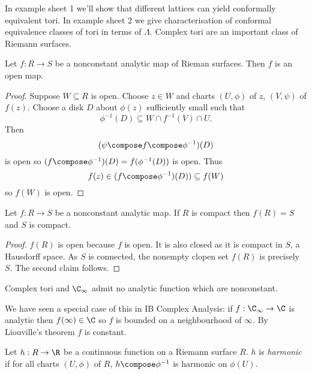 \documentclass[a4paper]{article}
\begin{document}
In example sheet 1 we'll show that different lattices can yield conformally equivalent tori. In example sheet 2 we give characterisation of conformal equivalence classes of tori in terms of \(\Lambda\). Complex tori are an important class of Riemann surfaces.

\begin{theorem}
  Let \(f: R \to S\) be a nonconstant analytic map of Rieman surfaces. Then \(f\) is an open map.
\end{theorem}

\begin{proof}
  Suppose \(W \subseteq R\) is open. Choose \(z \in W\) and charts \((U, \phi)\) of \(z\), \((V, \psi)\) of \(f(z)\). Choose a disk \(D\) about \(\phi(z)\) sufficiently small such that
  \[
    \phi^{-1}(D) \subseteq W \cap f^{-1}(V) \cap U.
  \]
  Then
  \[
    (\psi \compose f \compose \phi^{-1})(D)
  \]
  is open so \((f \compose \phi^{-1})(D) = f(\phi^{-1}(D))\) is open. Thus
  \[
    f(z) \in (f \compose \phi^{-1})(D)) \subseteq f(W)
  \]
  so \(f(W)\) is open.
\end{proof}

\begin{corollary}
  Let \(f: R \to S\) be a nonconstant analytic map. If \(R\) is compact then \(f(R) = S\) and \(S\) is compact.
\end{corollary}

\begin{proof}
  \(f(R)\) is open because \(f\) is open. It is also closed as it is compact in \(S\), a Hausdorff space. As \(S\) is connected, the nonempty clopen set \(f(R)\) is precisely \(S\). The second claim follows.
\end{proof}

\begin{corollary}
  Complex tori and \(\C_\infty\) admit no analytic function which are nonconstant.
\end{corollary}

We have seen a special case of this in IB Complex Analysis: if \(f: \C_\infty \to \C\) is analytic then \(f(\infty) \in \C\) so \(f\) is bounded on a neighbourhood of \(\infty\). By Liouville's theorem \(f\) is constant.

\begin{definition}
  Let \(h: R \to \R\) be a continuous function on a Riemann surface \(R\). \(h\) is \emph{harmonic} if for all charts \((U, \phi)\) of \(R\), \(h \compose \phi^{-1}\) is harmonic on \(\phi(U)\).
\end{definition}
\end{document}
